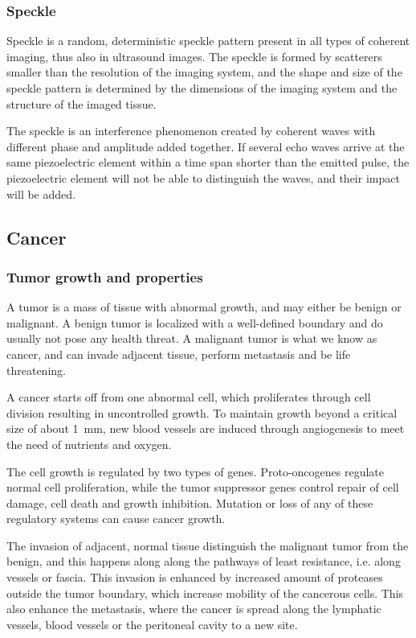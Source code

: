 \subsubsection{Speckle}
Speckle is a random, deterministic speckle pattern present in all types of coherent imaging, thus also in ultrasound images. The speckle is formed by scatterers smaller than the resolution of the imaging system, and the shape and size of the speckle pattern is determined by the dimensions of the imaging system and the structure of the imaged tissue.

The speckle is an interference phenomenon created by coherent waves with different phase and amplitude added together. If several echo waves arrive at the same piezoelectric element within a time span shorter than the emitted pulse, the piezoelectric element will not be able to distinguish the waves, and their impact will be added. 

\subsection{Cancer}
\subsubsection{Tumor growth and properties}

 A tumor is a mass of tissue with abnormal growth, and may either be benign or malignant. A benign tumor is localized with a  well-defined boundary and do usually not pose any health threat. A malignant tumor is what we know as cancer, and can invade adjacent tissue, perform metastasis and be life threatening. 

A cancer starts off from one abnormal cell, which proliferates through cell division resulting in uncontrolled growth. To maintain growth beyond a critical size of about \SI{1}{\milli\metre}\cite{king2006cancer}, new blood vessels are induced through angiogenesis to meet the need of nutrients and oxygen. 

The cell growth is regulated by two types of genes. Proto-oncogenes regulate normal cell proliferation, while the tumor suppressor genes control repair of cell damage, cell death and growth inhibition. Mutation or loss of any of these regulatory systems can cause cancer growth. 

The invasion of adjacent, normal tissue distinguish the malignant tumor from the benign, and this happens along along the pathways of least resistance, i.e. along vessels or fascia. This invasion is enhanced by increased amount of proteases outside the tumor boundary, which increase mobility of the cancerous cells. This also enhance the metastasis, where the cancer is spread along the lymphatic vessels, blood vessels or the peritoneal cavity to a new site.
 
